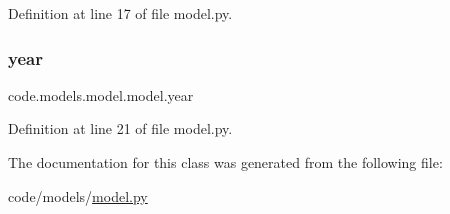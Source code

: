 Definition at line 17 of file model.\+py.

\mbox{\label{classcode_1_1models_1_1model_1_1model_ac9619b942cec2ddaa57336fbb3805d21}} 
\subsubsection{\texorpdfstring{year}{year}}
{\footnotesize\ttfamily code.\+models.\+model.\+model.\+year}



Definition at line 21 of file model.\+py.



The documentation for this class was generated from the following file\+:\begin{DoxyCompactItemize}
\item 
code/models/\hyperlink{model_8py}{model.\+py}\end{DoxyCompactItemize}

